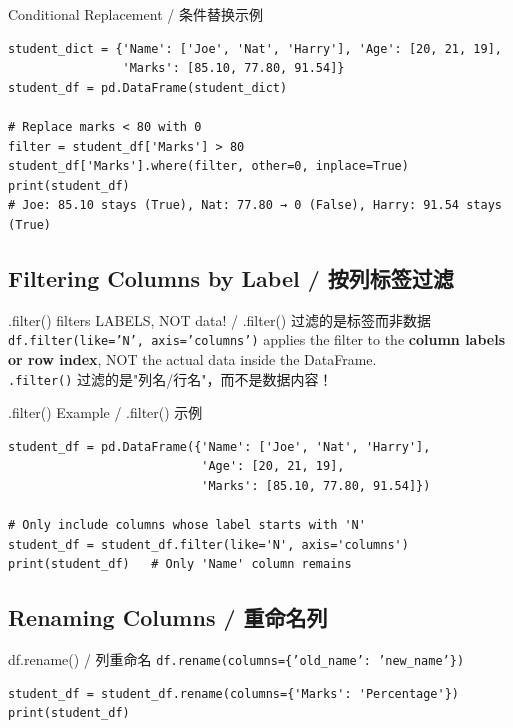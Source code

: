 \documentclass[11pt,a4paper]{article}
\begin{document}
\begin{examplebox}{Conditional Replacement / 条件替换示例}
\begin{lstlisting}
student_dict = {'Name': ['Joe', 'Nat', 'Harry'], 'Age': [20, 21, 19],
                'Marks': [85.10, 77.80, 91.54]}
student_df = pd.DataFrame(student_dict)

# Replace marks < 80 with 0
filter = student_df['Marks'] > 80
student_df['Marks'].where(filter, other=0, inplace=True)
print(student_df)
# Joe: 85.10 stays (True), Nat: 77.80 → 0 (False), Harry: 91.54 stays (True)
\end{lstlisting}
\end{examplebox}

\subsection{Filtering Columns by Label / 按列标签过滤}

\begin{warning}{.filter() filters LABELS, NOT data! / .filter() 过滤的是标签而非数据}
    \texttt{df.filter(like='N', axis='columns')} applies the filter to the \textbf{column labels or row index}, NOT the actual data inside the DataFrame. \\
    \texttt{.filter()} 过滤的是"列名/行名"，而不是数据内容！
\end{warning}

\begin{examplebox}{.filter() Example / .filter() 示例}
\begin{lstlisting}
student_df = pd.DataFrame({'Name': ['Joe', 'Nat', 'Harry'],
                           'Age': [20, 21, 19],
                           'Marks': [85.10, 77.80, 91.54]})

# Only include columns whose label starts with 'N'
student_df = student_df.filter(like='N', axis='columns')
print(student_df)   # Only 'Name' column remains
\end{lstlisting}
\end{examplebox}

\subsection{Renaming Columns / 重命名列}

\begin{examplebox}{df.rename() / 列重命名}
    \texttt{df.rename(columns=\{'old\_name': 'new\_name'\})}
\begin{lstlisting}
student_df = student_df.rename(columns={'Marks': 'Percentage'})
print(student_df)
\end{lstlisting}
\end{examplebox}
\end{document}
